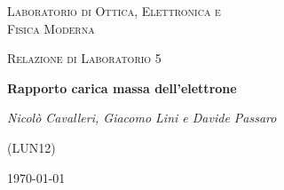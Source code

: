 \documentclass[a4paper,11pt]{article}
\begin{document}
\begin{titlepage}
	\centering
	{\scshape\LARGE Laboratorio di Ottica, Elettronica e \\ Fisica Moderna \par}
	\vspace{1cm}
	{\scshape\Large Relazione di Laboratorio 5\par}
	\vspace{1.5cm}
	{\huge\bfseries Rapporto carica massa dell'elettrone\par}
	\vspace{2cm}

	{\Large\itshape Nicolò Cavalleri, Giacomo Lini e Davide Passaro
		
	(LUN12)}

	\vspace{5cm}
	\vfill

	\begin{abstract}
		Questo documento contiene la procedura e l'analisi dati di un esperimento volto a misurare il rapporto tra la carica e la massa dell'elettrone. L'esperimento seguito non corrisponde a quello di Thompson (il primo esperimento che ottenne questa misura) ma una variante che, utilizzando una coppia di bobine di Hemholtz, riesce a produrre un campo magnetico più facilmente misurabile.
	\end{abstract}


	\vfill
	{\large \today\par}
	
\end{titlepage}

\newpage
\end{document}
